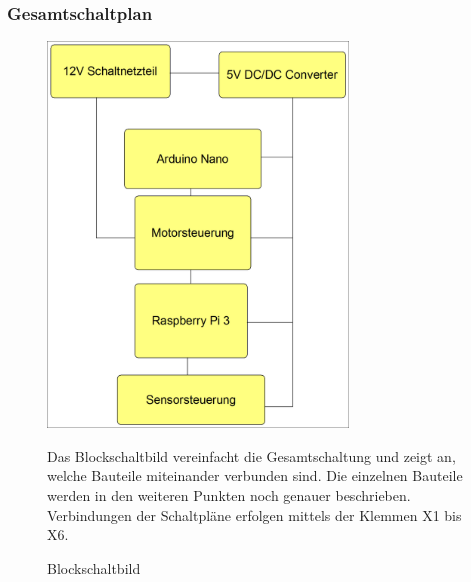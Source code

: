 \subsubsection{Gesamtschaltplan}
\begin{figure}[H]
\begin{minipage}[t]{6cm}
\vspace{0pt}
\centering
\includegraphics[width=8cm]{Bilder/Schaltplan/Blockschaltbild}
\caption{Blockschaltbild}
\label{Blockschaltbild}
\end{minipage}
\hfill
\begin{minipage}[t]{7cm}
\vspace{0pt}
Das Blockschaltbild vereinfacht die Gesamtschaltung und zeigt an, welche Bauteile miteinander verbunden sind. Die einzelnen Bauteile werden in den weiteren Punkten noch genauer beschrieben.
Verbindungen der Schaltpläne erfolgen mittels der Klemmen X1 bis X6.
\end{minipage}
\end{figure}

 
